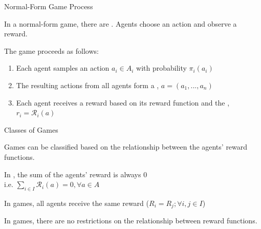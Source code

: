 \begin{frame}{Normal-Form Game Process}

    In a normal-form game, there are . Agents choose an action and observe a reward.
    \vspace{10pt}
    \pause
    
    The game proceeds as follows:
    \pause
    
    \begin{enumerate}
        \item<2-> Each agent samples an action \(a_i \in A_i\) with probability \(\pi_i(a_i)\)
        \pause
        \item<3-> The resulting actions from all agents form a , \(a = (a_1, ... , a_n)\)
        \pause
        \item<4-> Each agent receives a reward based on its  reward function and the , \(r_i = \mathcal{R}_i(a)\)
    \end{enumerate}
    
\end{frame}

\begin{frame}{Classes of Games}

    Games can be classified based on the relationship between the agents' reward functions. 

    \blist
        \item In , the sum of the agents' reward is always 0\\
        i.e. \(\sum_{i \in I} \mathcal{R}_{i} (a) = 0, \forall a \in A\)
        \item In  games, all agents receive the same reward 
        (\(R_i = R_j ; \forall i, j \in I\))
        \item In  games, there are no restrictions on the relationship between reward functions. 
    \elist
    
\end{frame}

